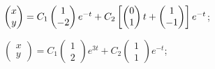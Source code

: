 \begin{enumsolsfull}
		\item \( \begin{pmatrix} x \\ y \end{pmatrix} = C_1 \begin{pmatrix} 1 \\ -2 \end{pmatrix} e^{-t} + C_2 \left[ \begin{pmatrix} 0 \\ 1 \end{pmatrix}t + \begin{pmatrix} 1 \\ -1 \end{pmatrix} \right] e^{-t} \); %
		\item \( \begin{pmatrix} x \\ y \end{pmatrix} = C_1 \begin{pmatrix} 1 \\ 2 \end{pmatrix} e^{3t} + C_2 \begin{pmatrix} 1 \\ 1 \end{pmatrix} e^{-t} \); %

\end{enumsolsfull}
